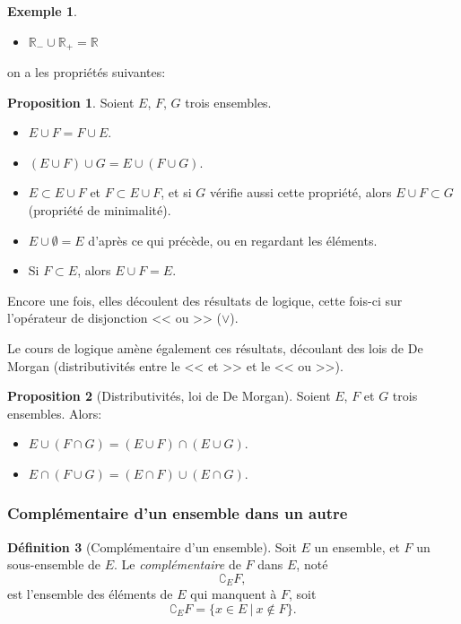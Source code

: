 \documentclass[11pt]{article}
\newcommand{\R}{\mathbb R}
\theoremstyle{definition}
\newtheorem{defn}{Définition}[section]
\newtheorem{prop}[defn]{Proposition}
\newtheorem{exe}{Exemple}
\theoremstyle{remark}
\begin{document}
\begin{exe}\leavevmode
\begin{itemize}
\item $\R_{-} \cup \R_{+} = \R$
\end{itemize}
\end{exe}

on a les propriétés suivantes:

\begin{prop}
Soient $E$, $F$, $G$ trois ensembles.
\begin{itemize}
\item $E\cup F=F\cup E$.
\item $(E\cup F)\cup G = E\cup(F\cup G)$.
\item $E\subset E\cup F $ et $F\subset E\cup F$, et si $G$ vérifie aussi cette propriété, alors $E\cup F\subset G$ (propriété de minimalité).
\item $E\cup\emptyset = E$ d'après ce qui précède, ou en regardant les éléments.
\item Si $F\subset E$, alors $E\cup F= E$.
\end{itemize}
\end{prop}

Encore une fois, elles découlent des résultats de logique, cette fois-ci sur l'opérateur de disjonction << ou >> ($\lor$).

Le cours de logique amène également ces résultats, découlant des lois de De Morgan (distributivités entre le << et >> et le << ou >>).

\begin{prop}[Distributivités, loi de De Morgan]
Soient $E$, $F$ et $G$ trois ensembles. Alors:
\begin{itemize}
\item $E\cup(F\cap G) = (E\cup F)\cap(E\cup G)$.
\item $E\cap(F\cup G) = (E\cap F)\cup(E\cap G)$.
\end{itemize}
\end{prop}

\subsubsection{Complémentaire d'un ensemble dans un autre}

\begin{defn}[Complémentaire d'un ensemble]
Soit $E$ un ensemble, et $F$ un sous-ensemble de $E$. Le \textit{complémentaire} de $F$ dans $E$, noté
\[\complement_E F, \]
est l'ensemble des éléments de $E$ qui manquent à $F$, soit
\[\complement_E F = \{x\in E\ |\ x\not\in F\}. \]
\end{defn}
\end{document}
